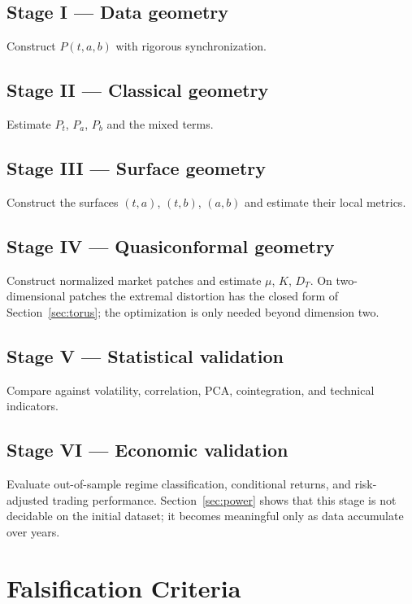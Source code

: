 \documentclass[11pt,a4paper]{article}
\numberwithin{equation}{section}
\begin{document}
\subsection*{Stage I --- Data geometry}
Construct $P(t,a,b)$ with rigorous synchronization.

\subsection*{Stage II --- Classical geometry}
Estimate $P_t$, $P_a$, $P_b$ and the mixed terms.

\subsection*{Stage III --- Surface geometry}
Construct the surfaces $(t,a)$, $(t,b)$, $(a,b)$ and estimate their
local metrics.

\subsection*{Stage IV --- Quasiconformal geometry}
Construct normalized market patches and estimate $\mu$, $K$, $D_T$.
On two-dimensional patches the extremal distortion has the closed
form of Section~\ref{sec:torus}; the optimization is only needed
beyond dimension two.

\subsection*{Stage V --- Statistical validation}
Compare against volatility, correlation, PCA, cointegration, and
technical indicators.

\subsection*{Stage VI --- Economic validation}
Evaluate out-of-sample regime classification, conditional returns,
and risk-adjusted trading performance. Section~\ref{sec:power}
shows that this stage is not decidable on the initial dataset; it
becomes meaningful only as data accumulate over years.

\section{Falsification Criteria}
\end{document}
